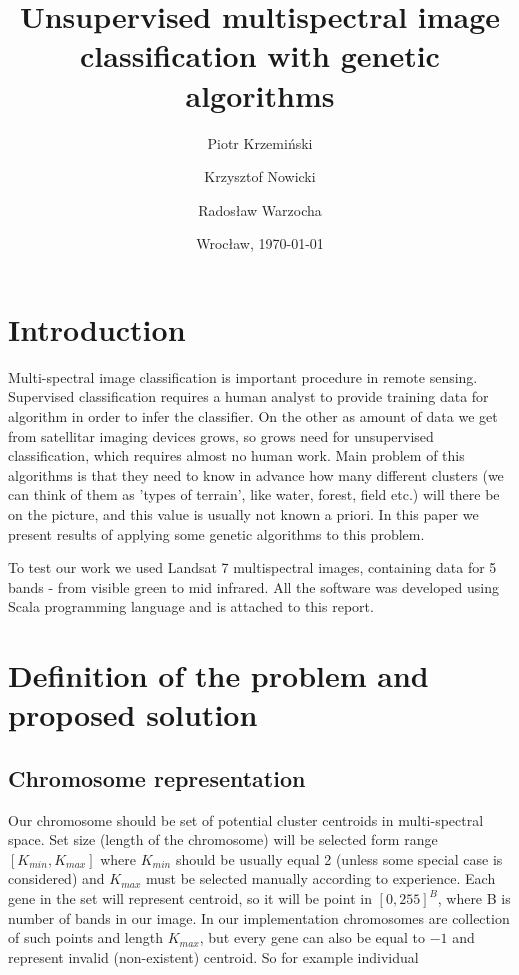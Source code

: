 \documentclass[11pt,leqno]{article}
\title{{\textbf{Unsupervised multispectral image classification with genetic algorithms}}}
\author{Piotr Krzemiński \and Krzysztof Nowicki \and Radosław Warzocha}
\date{Wrocław, \today}
\theoremstyle{mytheoremstyle}
\theoremstyle{mytheoremstyle}
\begin{document}
\maketitle
\thispagestyle{empty}

\vspace{5cm}

\section{Introduction}

Multi-spectral image classification is important procedure in remote sensing. Supervised classification requires a human analyst to provide training data for algorithm in order to infer the classifier. On the other as amount of data we get from satellitar imaging devices grows, so grows need for unsupervised classification, which requires almost no human work. Main problem of this algorithms is that they need to know in advance how many different clusters (we can think of them as 'types of terrain', like water, forest, field etc.) will there be on the picture, and this value is usually not known a priori. In this paper we present results of applying some genetic algorithms to this problem.

To test our work we used Landsat 7 multispectral images, containing data for 5  bands - from visible green to mid infrared. All the software was developed using Scala programming language and is attached to this report.

\section{Definition of the problem and proposed solution}

\subsection{Chromosome representation}

Our chromosome should be set of potential cluster centroids in multi-spectral space. Set size (length of the chromosome) will be selected form range $[K_{min}, K_{max}]$ where $K_{min}$ should be usually equal 2 (unless some special case is considered) and $K_{max}$ must be selected manually according to experience. Each gene in the set will represent centroid, so it will be point in $[0,255]^B$, where B is number of bands in our image. In our implementation chromosomes are collection of such points and length $K_{max}$, but every gene can also be equal to $-1$ and represent invalid (non-existent) centroid. So for example individual
\end{document}
